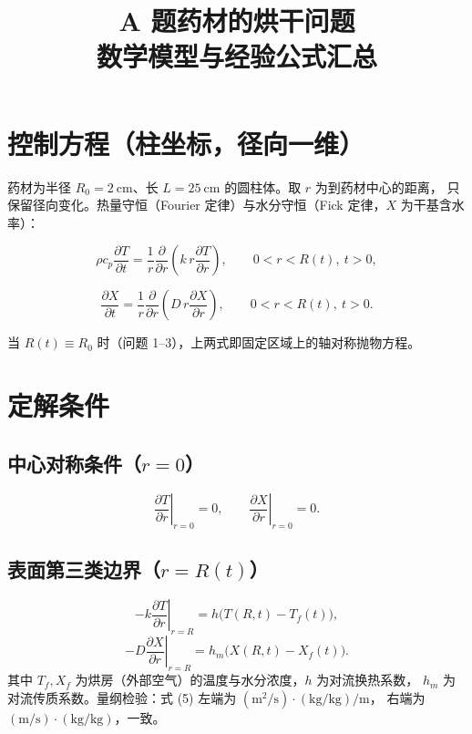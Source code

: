 \documentclass[11pt]{ctexart}
\title{A 题\quad 药材的烘干问题\\[4pt]\large 数学模型与经验公式汇总}
\author{}
\date{}
\newcommand{\pd}[2]{\frac{\partial #1}{\partial #2}}
\begin{document}
\maketitle

\section{控制方程（柱坐标，径向一维）}

药材为半径 $R_0=2\ \mathrm{cm}$、长 $L=25\ \mathrm{cm}$ 的圆柱体。取 $r$ 为到药材中心的距离，
只保留径向变化。热量守恒（Fourier 定律）与水分守恒（Fick 定律，$X$ 为干基含水率）：

\begin{equation}
\rho c_p \pd{T}{t}
=\frac{1}{r}\pd{}{r}\!\left(k\,r\pd{T}{r}\right),
\qquad 0<r<R(t),\ t>0,
\end{equation}

\begin{equation}
\pd{X}{t}
=\frac{1}{r}\pd{}{r}\!\left(D\,r\pd{X}{r}\right),
\qquad 0<r<R(t),\ t>0 .
\end{equation}

当 $R(t)\equiv R_0$ 时（问题 1--3），上两式即固定区域上的轴对称抛物方程。

\section{定解条件}

\subsection*{中心对称条件（$r=0$）}
\begin{equation}
\left.\pd{T}{r}\right|_{r=0}=0,
\qquad
\left.\pd{X}{r}\right|_{r=0}=0 .
\end{equation}

\subsection*{表面第三类边界（$r=R(t)$）}
\begin{equation}
-k\left.\pd{T}{r}\right|_{r=R}=h\bigl(T(R,t)-T_f(t)\bigr),
\end{equation}
\begin{equation}
-D\left.\pd{X}{r}\right|_{r=R}=h_m\bigl(X(R,t)-X_f(t)\bigr).
\end{equation}
其中 $T_f,X_f$ 为烘房（外部空气）的温度与水分浓度，$h$ 为对流换热系数，
$h_m$ 为对流传质系数。量纲检验：式 (5) 左端为 $\mathrm{(m^2/s)\cdot(kg/kg)/m}$，
右端为 $\mathrm{(m/s)\cdot(kg/kg)}$，一致。
\end{document}
